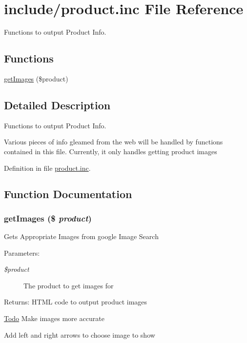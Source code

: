 \hypertarget{product_8inc}{
\section{include/product.inc File Reference}
\label{product_8inc}
}
Functions to output Product Info. 

\subsection*{Functions}
\begin{CompactItemize}
\item 
\hyperlink{product_8inc_9dbb778854cfe105058d7161ca8f058c}{getImages} (\$product)
\end{CompactItemize}


\subsection{Detailed Description}
Functions to output Product Info. 

Various pieces of info gleamed from the web will be handled by functions contained in this file. Currently, it only handles getting product images 

Definition in file \hyperlink{product_8inc-source}{product.inc}.

\subsection{Function Documentation}
\hypertarget{product_8inc_9dbb778854cfe105058d7161ca8f058c}{
\subsubsection{\setlength{\rightskip}{0pt plus 5cm}getImages (\$ {\em product})}}
\label{product_8inc_9dbb778854cfe105058d7161ca8f058c}


Gets Appropriate Images from google Image Search \begin{Desc}
\item[Parameters:]
\begin{description}
\item[{\em \$product}]The product to get images for \end{description}
\end{Desc}
\begin{Desc}
\item[Returns:]HTML code to output product images \end{Desc}
\begin{Desc}
\item[\hyperlink{todo__todo000002}{Todo}]Make images more accurate 

Add left and right arrows to choose image to show \end{Desc}


